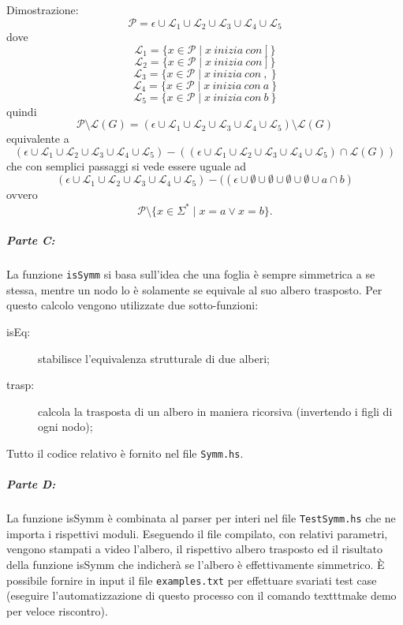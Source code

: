 \documentclass[a4paper, oneside, 11pt]{article}
\begin{document}
Dimostrazione:
\\
\[\mathcal{P}= \epsilon \cup \mathcal{L}_{1} \cup \mathcal{L}_{2} \cup \mathcal{L}_{3} \cup \mathcal{L}_{4} \cup \mathcal{L}_{5}\]
dove
\[\mathcal{L}_{1} = \{ x \in \mathcal{P} \mid x\ inizia\ con\ {[}\ \} \]
\[\mathcal{L}_{2} = \{ x \in \mathcal{P} \mid x\ inizia\ con\ {]}\ \} \]
\[\mathcal{L}_{3} = \{ x \in \mathcal{P} \mid x\ inizia\ con\ {,}\ \} \]
\[\mathcal{L}_{4} = \{ x \in \mathcal{P} \mid x\ inizia\ con\ {a}\ \} \]
\[\mathcal{L}_{5} = \{ x \in \mathcal{P} \mid x\ inizia\ con\ {b}\ \} \]
quindi
\[\mathcal{P}\setminus\mathcal{L}(G) = (\epsilon \cup \mathcal{L}_{1} \cup \mathcal{L}_{2} \cup \mathcal{L}_{3} \cup \mathcal{L}_{4} \cup \mathcal{L}_{5} )\setminus \mathcal{L}(G) \]
equivalente a
\[(\epsilon \cup \mathcal{L}_{1} \cup \mathcal{L}_{2} \cup \mathcal{L}_{3} \cup \mathcal{L}_{4} \cup \mathcal{L}_{5} )- %
( (\epsilon \cup \mathcal{L}_{1} \cup \mathcal{L}_{2} \cup \mathcal{L}_{3} \cup \mathcal{L}_{4} \cup \mathcal{L}_{5} )\cap \mathcal{L}(G) ) \]
che con semplici passaggi si vede essere uguale ad
\[(\epsilon \cup \mathcal{L}_{1} \cup \mathcal{L}_{2} \cup \mathcal{L}_{3} \cup \mathcal{L}_{4} \cup \mathcal{L}_{5} ) - ( (\epsilon \cup \emptyset \cup \emptyset  \cup \emptyset \cup \emptyset \cup {a} \cap {b} ) \]
ovvero
\[\mathcal{P}\setminus\{x\in\Sigma^{\ast}\mid x=a \vee x=b\}.\]

\subparagraph*{Parte C:}
La funzione \texttt{isSymm} si basa sull'idea che una foglia \`e sempre simmetrica a se stessa, mentre un nodo lo \`e solamente se equivale al suo albero trasposto. Per questo calcolo vengono utilizzate due sotto-funzioni:
\begin{description}
  \item[isEq:] stabilisce l'equivalenza strutturale di due alberi;
  \item[trasp:] calcola la trasposta di un albero in maniera ricorsiva (invertendo i figli di ogni nodo);
\end{description}
\par
Tutto il codice relativo \`e fornito nel file \texttt{Symm.hs}.
\par
\subparagraph*{Parte D:}
La funzione isSymm \`e combinata al parser per interi nel file \texttt{TestSymm.hs} che ne importa i rispettivi moduli. Eseguendo il file compilato, con relativi parametri, vengono stampati a video l'albero, il rispettivo albero trasposto ed il risultato della funzione isSymm che indicher\`a se l'albero \`e effettivamente simmetrico.
\`E possibile fornire in input il file \texttt{examples.txt} per effettuare svariati test case (eseguire l'automatizzazione di questo processo con il comando texttt{make demo} per veloce riscontro).
\end{document}
